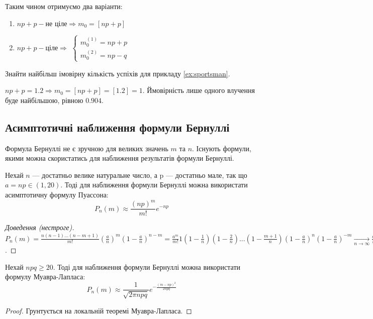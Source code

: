 Таким чином отримуємо два варіанти:
\begin{enumerate}
    \item $np+p - \text{не ціле} \Rightarrow m_0 = \left[np+p\right]$
    \item $np+p - \text{ціле} \Rightarrow $
    $
    \begin{cases}
        m_0^{(1)} = np+p \\
        m_0^{(2)} = np-q
    \end{cases}
    $
\end{enumerate}

\begin{example}
    Знайти найбільш імовірну кількість успіхів для прикладу \eqref{ex:sportsman}.

    $np + p = 1.2 \Rightarrow m_0 = \left[np + p\right] = \left[1.2\right] = 1$.
    Ймовірність лише одного влучення буде найбільшою, рівною $0.904$.
\end{example}

\subsection{Асимптотичні наближення формули Бернуллі}
Формула Бернуллі не є зручною для великих значень $m$ та $n$. Існують формули, якими можна 
скористатись для наближення результатів формули Бернуллі.
\begin{proposition}
    Нехай $n$ --- достатньо велике натуральне число, а p --- достатньо мале, так що 
    $a = np \in (1, 20)$. Тоді для наближення формули Бернуллі можна використати 
    асимптотичну формулу Пуассона:
    $$P_n(m) \approx \frac{(np)^m}{m!}e^{-np}$$
\end{proposition}
\begin{proof}[Доведення (нестроге)]
    $P_n(m) = \frac{n(n-1)...(n-m+1)}{m!} \left(\frac{a}{n}\right)^m 
    (1-\frac{a}{n})^{n-m} = \frac{a^m}{m!} 1(1 - \frac{1}{n})(1 - \frac{2}{n})
    ...(1 - \frac{m+1}{n})(1-\frac{a}{n})^n (1-\frac{a}{n})^{-m} 
    \underset{n \rightarrow \infty}{\longrightarrow} \frac{a^m}{m!}e^{-a} = \frac{(np)^m}{m!}e^{-np}$.
\end{proof}
\begin{proposition}
    Нехай $npq \geq 20$. Тоді для наближення формули Бернуллі можна використати 
    формулу Муавра-Лапласа:
    $$P_n(m) \approx \frac{1}{\sqrt{2\pi npq}} e^{-\frac{(m-np)^2}{2npq}}$$
\end{proposition}
\begin{proof}
    Грунтується на локальній теоремі Муавра-Лапласа.
\end{proof}